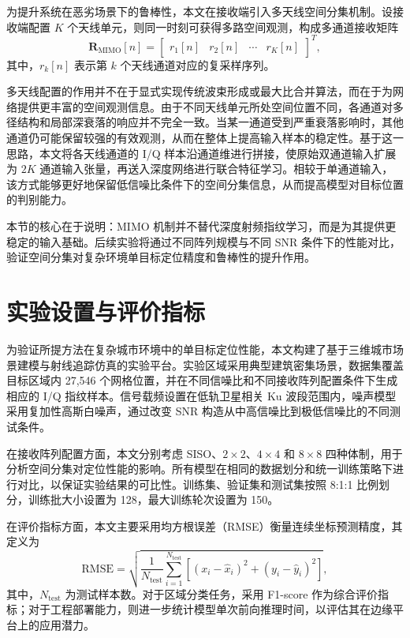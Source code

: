 为提升系统在恶劣场景下的鲁棒性，本文在接收端引入多天线空间分集机制。设接收端配置 \(K\) 个天线单元，则同一时刻可获得多路空间观测，构成多通道接收矩阵
\begin{equation}
\mathbf{R}_{\mathrm{MIMO}}[n]=
\begin{bmatrix}
r_1[n] & r_2[n] & \cdots & r_K[n]
\end{bmatrix}^{T},
\label{eq:mimo_signal_ch3}
\end{equation}
其中，\(r_k[n]\) 表示第 \(k\) 个天线通道对应的复采样序列。

多天线配置的作用并不在于显式实现传统波束形成或最大比合并算法，而在于为网络提供更丰富的空间观测信息。由于不同天线单元所处空间位置不同，各通道对多径结构和局部深衰落的响应并不完全一致。当某一通道受到严重衰落影响时，其他通道仍可能保留较强的有效观测，从而在整体上提高输入样本的稳定性。基于这一思路，本文将各天线通道的 I/Q 样本沿通道维进行拼接，使原始双通道输入扩展为 \(2K\) 通道输入张量，再送入深度网络进行联合特征学习。相较于单通道输入，该方式能够更好地保留低信噪比条件下的空间分集信息，从而提高模型对目标位置的判别能力。

本节的核心在于说明：MIMO 机制并不替代深度射频指纹学习，而是为其提供更稳定的输入基础。后续实验将通过不同阵列规模与不同 SNR 条件下的性能对比，验证空间分集对复杂环境单目标定位精度和鲁棒性的提升作用。

\section{实验设置与评价指标}
\label{sec:3_5}

为验证所提方法在复杂城市环境中的单目标定位性能，本文构建了基于三维城市场景建模与射线追踪仿真的实验平台。实验区域采用典型建筑密集场景，数据集覆盖目标区域内 27,546 个网格位置，并在不同信噪比和不同接收阵列配置条件下生成相应的 I/Q 指纹样本。信号载频设置在低轨卫星相关 Ku 波段范围内，噪声模型采用复加性高斯白噪声，通过改变 SNR 构造从中高信噪比到极低信噪比的不同测试条件。

在接收阵列配置方面，本文分别考虑 SISO、\(2\times2\)、\(4\times4\) 和 \(8\times8\) 四种体制，用于分析空间分集对定位性能的影响。所有模型在相同的数据划分和统一训练策略下进行对比，以保证实验结果的可比性。训练集、验证集和测试集按照 8:1:1 比例划分，训练批大小设置为 128，最大训练轮次设置为 150。

在评价指标方面，本文主要采用均方根误差（RMSE）衡量连续坐标预测精度，其定义为
\begin{equation}
\mathrm{RMSE}=\sqrt{\frac{1}{N_{\mathrm{test}}}\sum_{i=1}^{N_{\mathrm{test}}}\left[(x_i-\hat{x}_i)^2+(y_i-\hat{y}_i)^2\right]},
\label{eq:rmse_ch3}
\end{equation}
其中，\(N_{\mathrm{test}}\) 为测试样本数。对于区域分类任务，采用 F1-score 作为综合评价指标；对于工程部署能力，则进一步统计模型单次前向推理时间，以评估其在边缘平台上的应用潜力。

